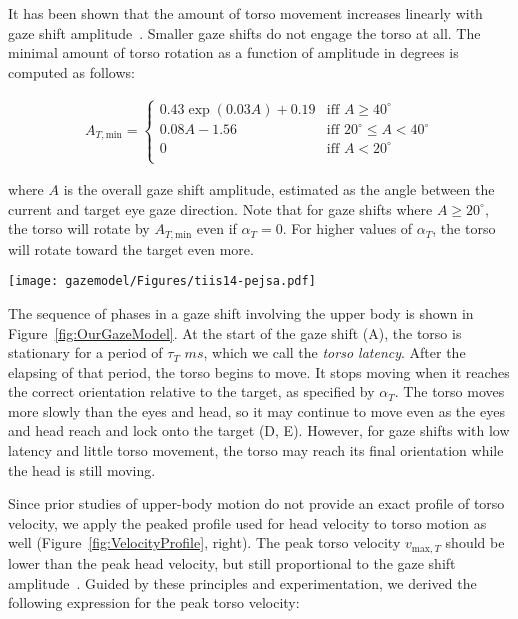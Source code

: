 It has been shown that the amount of torso movement increases linearly with gaze shift amplitude~\cite{mccluskey2007monkeys}. Smaller gaze shifts do not engage the torso at all. The minimal amount of torso rotation as a function of amplitude in degrees is computed as follows:

\begin{align} \label{eq:TorsoAmin}
A_{T,\mathrm{min}} = \begin{cases}
0.43 \mathop{exp}(0.03 A) + 0.19 & \mbox{iff } A \geq 40^{\circ} \\
0.08 A - 1.56 & \mbox{iff } 20^{\circ} \leq A < 40^{\circ} \\
0 & \mbox{iff } A < 20^{\circ} \\
\end{cases}
\end{align}

where $A$ is the overall gaze shift amplitude, estimated as the angle between the current and target eye gaze direction. Note that for gaze shifts where $A \geq 20^{\circ}$, the torso will rotate by $A_{T,\mathrm{min}}$ even if $\alpha_T = 0$. For higher values of $\alpha_T$, the torso will rotate toward the target even more.

\begin{figure*}
\centering
\texttt{[image: gazemodel/Figures/tiis14-pejsa.pdf]}
\caption{Movement phases of the eyes, head, and torso in a gaze shift. Dashed area indicates that the torso may stop moving before or after the head.}
\label{fig:OurGazeModel}
\end{figure*}

The sequence of phases in a gaze shift involving the upper body is shown in Figure~\ref{fig:OurGazeModel}. At the start of the gaze shift (A), the torso is stationary for a period of $\tau_T$ $ms$, which we call the \emph{torso latency}. After the elapsing of that period, the torso begins to move. It stops moving when it reaches the correct orientation relative to the target, as specified by $\alpha_T$. The torso moves more slowly than the eyes and head, so it may continue to move even as the eyes and head reach and lock onto the target (D, E). However, for gaze shifts with low latency and little torso movement, the torso may reach its final orientation while the head is still moving.

Since prior studies of upper-body motion do not provide an exact profile of torso velocity, we apply the peaked profile used for head velocity to torso motion as well (Figure~\ref{fig:VelocityProfile}, right). The peak torso velocity $v_{\mathrm{max},T}$ should be lower than the peak head velocity, but still proportional to the gaze shift amplitude~\cite{mccluskey2007monkeys}. Guided by these principles and experimentation, we derived the following expression for the peak torso velocity:

